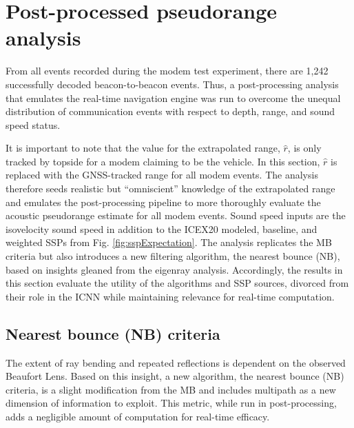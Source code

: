 \documentclass[preprint,TurnOnLineNumbers]{JASA}
\newcommand{\llabel}[1]{\hypertarget{llineno:#1}{\linelabel{#1}}}
\begin{document}
\clearpage
\section{\label{sec:post} Post-processed pseudorange analysis}

From all events recorded during the modem test experiment, there are 1,242 successfully decoded beacon-to-beacon events.
Thus, a post-processing analysis that emulates the real-time navigation engine was run to overcome the unequal distribution of communication events with respect to depth, range, and sound speed status.

It is important to note that the value for the extrapolated range, $\hat{r}$, is only tracked by topside for a modem claiming to be the vehicle.
In this section, $\hat{r}$ is replaced with the GNSS-tracked range for all modem events.
The analysis therefore seeds realistic but ``omniscient'' knowledge of the extrapolated range and emulates the post-processing pipeline to more thoroughly evaluate the acoustic pseudorange estimate for all modem events.
Sound speed inputs are the isovelocity sound speed in addition to the ICEX20 modeled, baseline, and weighted SSPs from Fig. \ref{fig:sspExpectation}.
The analysis replicates the MB criteria but also introduces a new filtering algorithm, the nearest bounce (NB), based on insights gleaned from the eigenray analysis.
Accordingly, the results in this section evaluate the utility of the algorithms and SSP sources, divorced from their role in the ICNN while maintaining relevance for real-time computation.

\subsection{Nearest bounce (NB) criteria}

\llabel{2.12} The extent of ray bending and repeated reflections is dependent on the observed Beaufort Lens.
Based on this insight, a new algorithm, the nearest bounce (NB) criteria, is a slight modification from the MB and includes multipath as a new dimension of information to exploit.
This metric, while run in post-processing, adds a negligible amount of computation for real-time efficacy.
\end{document}

